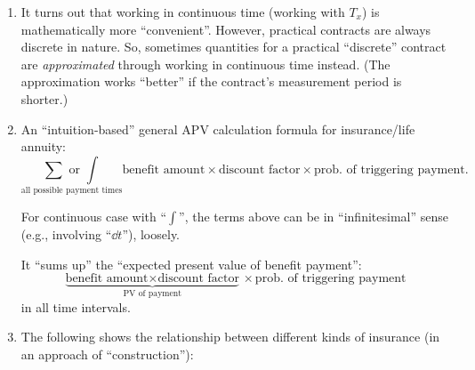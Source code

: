 \begin{enumerate}
\item It turns out that working in continuous time (working with \(T_x\)) is
mathematically more ``convenient''. However, practical contracts are always
discrete in nature. So, sometimes quantities for a practical ``discrete''
contract are \emph{approximated} through working in continuous time instead.
(The approximation works ``better'' if the contract's measurement period is
shorter.)

\item
\label{it:gen-apv-fmla}
\ystar An ``intuition-based'' general APV calculation formula for
insurance/life annuity:
\[
\underset{\text{all possible payment times}}{\sum\text{ or }\int}\text{benefit amount}\times\text{discount
factor}\times\text{prob.\ of triggering payment}.
\]
\begin{note}
For continuous case with ``\(\int\)'', the terms above can be in
``infinitesimal'' sense (e.g., involving ``\(\dd{t}\)''), loosely.
\end{note}


\begin{intuition}
It ``sums up'' the ``expected present value of benefit payment'':
\[
\underbrace{\text{benefit amount}\times\text{discount factor}}_{\text{PV of payment}}
\times\text{prob.\ of triggering payment}
\]
in all time intervals.
\end{intuition}
\item \label{it:insurance-relationship}
The following shows the relationship between different kinds of insurance
(in an approach of ``construction''):

\end{enumerate}

